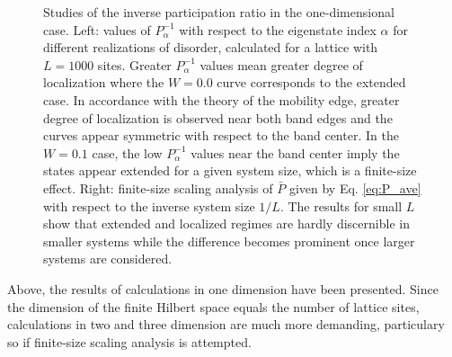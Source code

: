\documentclass[10pt,a4paper]{article}
\begin{document}
\begin{figure}[H]
\caption{Studies of the inverse participation ratio in the one-dimensional case. Left: values of $P^{-1}_\alpha$ with respect to the eigenstate index $\alpha$ for different realizations of disorder, calculated for a lattice with $L=1000$ sites. Greater $P^{-1}_\alpha$ values mean greater degree of localization where the $W=0.0$ curve corresponds to the extended case. In accordance with the theory of the mobility edge, greater degree of localization is observed near both band edges and the curves appear symmetric with respect to the band center. In the $W=0.1$ case, the low $P^{-1}_\alpha$ values near the band center imply the states appear extended for a given system size, which is a finite-size effect. Right: finite-size scaling analysis of $\bar{P}$ given by Eq. \eqref{eq:P_ave} with respect to the inverse system size $1/L$. The results for small $L$ show that extended and localized regimes are hardly discernible in smaller systems while the difference becomes prominent once larger systems are considered.   }
\label{fig:1D_ipr} 
\end{figure}
\noindent
Above, the results of calculations in one dimension have been presented. Since the dimension of the finite Hilbert space equals the number of lattice sites, calculations in two and three dimension are much more demanding, particulary so if finite-size scaling analysis is attempted. 
\end{document}
